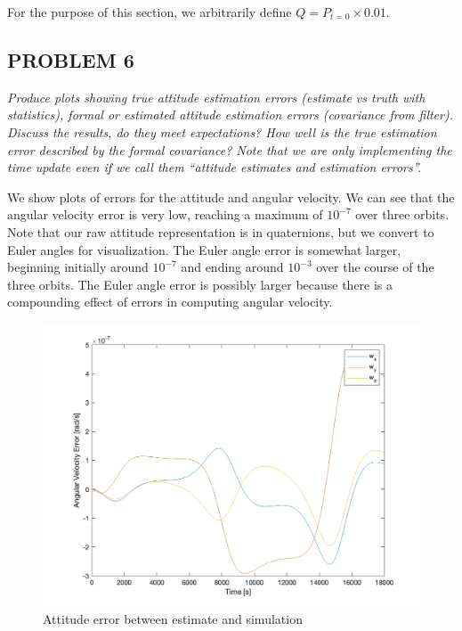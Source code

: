 For the purpose of this section, we arbitrarily define $Q = P_{t=0} \times 0.01$.

\subsection{PROBLEM 6}
\textit{Produce plots showing true attitude estimation errors (estimate vs truth with statistics), formal or estimated attitude estimation errors (covariance from filter). Discuss the results, do they meet expectations? How well is the true estimation error described by the formal covariance? Note that we are only implementing the time update even if we call them “attitude estimates and estimation errors”.}

We show plots of errors for the attitude and angular velocity. We can see that the angular velocity error is very low, reaching a maximum of $10^{-7}$ over three orbits. Note that our raw attitude representation is in quaternions, but we convert to Euler angles for visualization. The Euler angle error is somewhat larger, beginning initially around $10^{-7}$ and ending around $10^{-3}$ over the course of the three orbits. The Euler angle error is possibly larger because there is a compounding effect of errors in computing angular velocity.

\begin{figure}[H]
\centering
\includegraphics[scale=0.6]{Images/ps7_problem6_angvel_err.png}
\caption{Attitude error between estimate and simulation}
\label{fig:ps7_problem5a_angvel_sim}
\end{figure}

